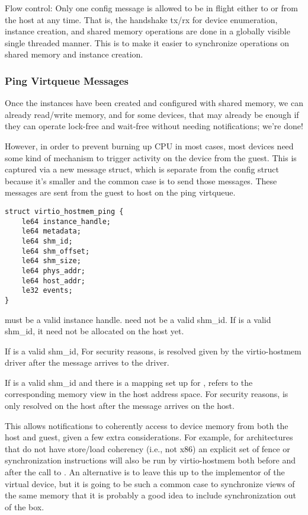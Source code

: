 Flow control: Only one config message is allowed to be in flight
either to or from the host at any time.
That is, the handshake tx/rx for device enumeration, instance creation, and shared memory operations
are done in a globally visible single threaded manner.
This is to make it easier to synchronize operations on shared memory and instance creation.

\subsubsection{Ping Virtqueue Messages}\label{sec:Device Types / Host Memory Device / Device Operation / Ping Virtqueue Messages}

Once the instances have been created and configured with shared memory,
we can already read/write memory, and for some devices, that may already be enough
if they can operate lock-free and wait-free without needing notifications; we're done!

However, in order to prevent burning up CPU in most cases,
most devices need some kind of mechanism to trigger activity on the device
from the guest. This is captured via a new message struct,
which is separate from the config struct because it's smaller and
the common case is to send those messages.
These messages are sent from the guest to host
on the ping virtqueue.

\begin{lstlisting}
struct virtio_hostmem_ping {
    le64 instance_handle;
    le64 metadata;
    le64 shm_id;
    le64 shm_offset;
    le64 shm_size;
    le64 phys_addr;
    le64 host_addr;
    le32 events;
}
\end{lstlisting}

 must be a valid instance handle.
 need not be a valid shm_id.
If  is a valid shm_id,
it need not be allocated on the host yet.

If  is a valid shm_id,
For security reasons,
 is resolved given  by
the virtio-hostmem driver after the message arrives to the driver.

If  is a valid shm_id
and there is a mapping set up for ,
 refers to the corresponding memory view in the host address space.
For security reasons,
 is only resolved on the host after the message arrives on the host.

This allows notifications to coherently access to device memory
from both the host and guest, given a few extra considerations.
For example, for architectures that do not have store/load coherency (i.e., not x86)
an explicit set of fence or synchronization instructions will also be run by virtio-hostmem
both before and after the call to .
An alternative is to leave this up to the implementor of the virtual device,
but it is going to be such a common case to synchronize views of the same memory
that it is probably a good idea to include synchronization out of the box.

